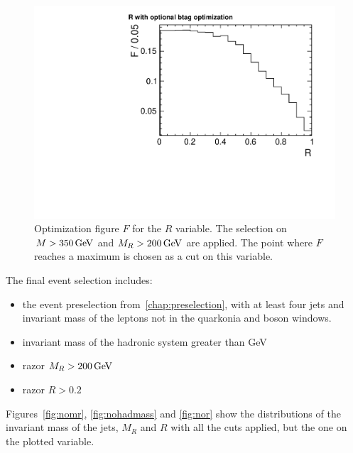 \begin{figure}[phtb]
    \centering
    \includegraphics[width=\textwidth]{images/pdf/cut_opt_r_optional_btag_4jets_AND_mr200_AND_had_mass350}
    \caption{Optimization figure $F$ for the $R$ variable. The selection
        on $M > \unit[350]{GeV}$ and $M_R > \unit[200]{GeV}$ are
    applied. The point where $F$ reaches a maximum is chosen as a cut on this variable.}
    \label{fig:opt_r}
\end{figure}

The final event selection includes:
\begin{itemize}\label{page:razor_selection}
    \item the event preselection from~\ref{chap:preselection}, with at least
        four jets and invariant mass of the leptons not in the quarkonia and
        \Z boson windows.
    \item invariant mass of the hadronic system greater than
        \unit[350]{GeV}
    \item razor $M_R > \unit[200]{GeV}$
    \item razor $R > 0.2$
\end{itemize}
Figures~\ref{fig:nomr}, \ref{fig:nohadmass} and \ref{fig:nor} show the distributions of the invariant mass of the jets,
$M_R$ and $R$ with all the cuts applied, but the one on the plotted
variable.

